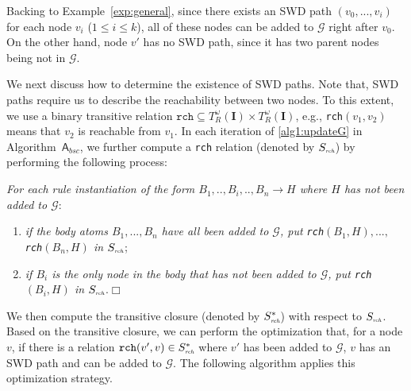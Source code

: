 \documentclass[final,1p,times]{elsarticle}
\begin{document}
Backing to Example~\ref{exp:general}, since
there exists an SWD path $(v_0,...,v_i)$ for each node $v_i$ ($1\leq i\leq k$), all of these nodes
can be added to $\mathcal{G}$ right after $v_0$. On the other hand,
node $v'$ has no SWD path, since it has two parent nodes being not in $\mathcal{G}$.

We next discuss how to determine the existence of SWD paths. Note that, SWD paths require us to
describe the reachability between two nodes. To this extent, we use a
binary transitive relation $\texttt{rch} \subseteq T_R^{\omega}(\textbf{I})\times T_R^{\omega}(\textbf{I})$,
e.g., \texttt{rch}$(v_1,v_2)$ means that $v_2$ is reachable from $v_1$.
In each iteration of \ref{alg1:updateG} in Algorithm~$\mathsf{A}_{bsc}$, we further compute a \texttt{rch}
relation (denoted by $S_{\textit{\tiny rch}}$) by performing the following process:

\begin{description}[leftmargin=2ex]
\item[(\textbf{\dag})] \emph{For each rule instantiation of the form $B_1,..,B_i,..,B_n\rightarrow H$
where $H$ has not been added to $\mathcal{G}$}:
\begin{enumerate}[leftmargin=2ex]
\item \emph{if the body atoms $B_1,...,B_n$ have all been added to $\mathcal{G}$, put \texttt{rch}$(B_1,H),...,$ \texttt{rch}$(B_n,H)$ in $S_{\textit{\tiny rch}}$};
\item \emph{if $B_i$ is the only node in the body that has not been added to $\mathcal{G}$,
    put \texttt{rch}$(B_i,H)$ in $S_{\textit{\tiny rch}}$}.\hfill$\Box$
\end{enumerate}
\end{description}

We then compute the transitive closure (denoted by $S^*_{\textit{\tiny rch}}$) with respect to
$S_{\textit{\tiny rch}}$. Based on the transitive closure, we can perform the optimization that,
for a node $v$, if there is a relation $\texttt{rch}(v',v)\in S^*_{\textit{\tiny rch}}$
where $v'$ has been added to $\mathcal{G}$, $v$ has an SWD path and can be added to $\mathcal{G}$.
The following algorithm applies this optimization strategy.\\
\end{document}
